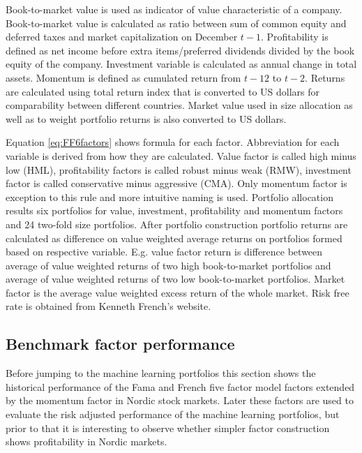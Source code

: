 \documentclass{article}
\begin{document}
Book-to-market value is used as indicator of value characteristic of a company. Book-to-market value is calculated as ratio between sum of common equity and deferred taxes and market capitalization on December $t-1$. Profitability is defined as net income before extra items/preferred dividends divided by the book equity of the company. Investment variable is calculated as annual change in total assets. Momentum is defined as cumulated return from $t-12$ to $t-2$. Returns are calculated using total return index that is converted to US dollars for comparability between different countries. Market value used in size allocation as well as to weight portfolio returns is also converted to US dollars. \par

Equation \ref{eq:FF6factors} shows formula for each factor. Abbreviation for each variable is derived from how they are calculated. Value factor is called high minus low (HML), profitability factors is called robust minus weak (RMW), investment factor is called conservative minus aggressive (CMA). Only momentum factor is exception to this rule and more intuitive naming is used. Portfolio allocation results six portfolios for value, investment, profitability and momentum factors and 24 two-fold size portfolios. After portfolio construction portfolio returns are calculated as difference on value weighted average returns on portfolios formed based on respective variable. E.g. value factor return is difference between average of value weighted returns of two high book-to-market portfolios and average of value weighted returns of two low book-to-market portfolios. Market factor is the average value weighted excess return of the whole market. Risk free rate is obtained from Kenneth French's website. \par

\subsection{Benchmark factor performance}\label{BenchmarkFactorPerformance}

Before jumping to the machine learning portfolios this section shows the historical performance of the Fama and French five factor \citeyear{FAMA20151} model factors extended by the momentum factor in Nordic stock markets. Later these factors are used to evaluate the risk adjusted performance of the machine learning portfolios, but prior to that it is interesting to observe whether simpler factor construction shows profitability in Nordic markets. \par
\end{document}
